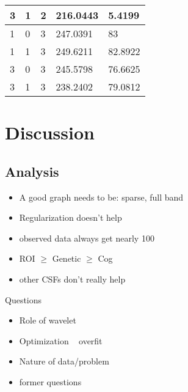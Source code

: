 \documentclass{article}
\theoremstyle{definition}
\begin{document}
\begin{table}[]
\begin{tabular}{|l|l|l|l|l|}
3                                      & 1                                       & 2                                      & 216.0443                                 & 5.4199                                 \\ \hline
1                                      & 0                                       & 3                                      & 247.0391                                 & 83                                     \\ \hline
1                                      & 1                                       & 3                                      & 249.6211                                 & 82.8922                                \\ \hline
3                                      & 0                                       & 3                                      & 245.5798                                 & 76.6625                                \\ \hline
3                                      & 1                                       & 3                                      & 238.2402                                 & 79.0812                                \\ \hline
\end{tabular}
\end{table}


\section{Discussion}
\subsection{Analysis}
\begin{itemize}
\item A good graph needs to be: sparse, full band
\item Regularization doesn't help
\item observed data always get nearly 100 %
\item ROI $\geq$ Genetic $\geq$ Cog
\item other CSFs don't really help
\end{itemize}

Questions
\begin{itemize}
\item Role of wavelet
\item Optimization ~ overfit
\item Nature of data/problem
\item former questions
\end{itemize}
  
\end{document}
